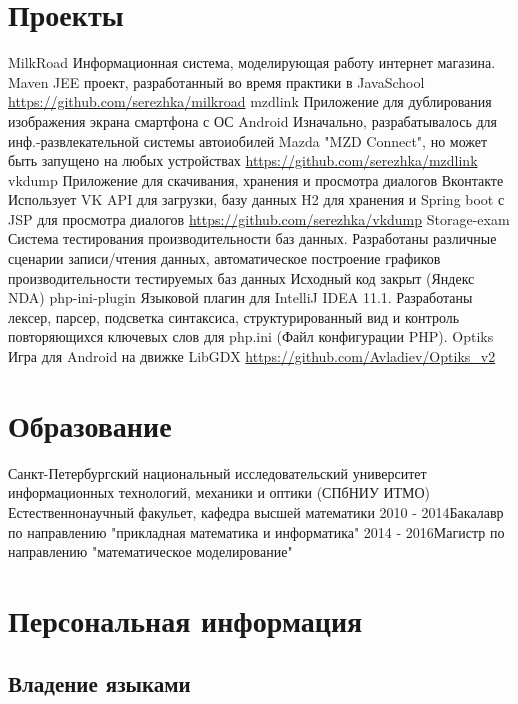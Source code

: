 \documentclass[11pt,a4paper,russian]{moderncv}
\begin{document}
\newpage  

\section{Проекты}
\cvline
    {MilkRoad}
    {Информационная система, моделирующая работу интернет магазина. Maven JEE проект, разработанный во время практики в JavaSchool \newline
    \url{https://github.com/serezhka/milkroad}}
\cvline
    {mzdlink}
    {Приложение для дублирования изображения экрана смартфона с ОС Android \newline
    Изначально, разрабатывалось для инф.-развлекательной системы автоиобилей Mazda "MZD Connect", но может быть запущено на любых устройствах \newline
    \url{https://github.com/serezhka/mzdlink}}
\cvline
    {vkdump}
    {Приложение для скачивания, хранения и просмотра диалогов Вконтакте \newline
    Использует VK API для загрузки, базу данных H2 для хранения и Spring boot с JSP для просмотра диалогов \newline
    \url{https://github.com/serezhka/vkdump}}
\cvline
    {Storage-exam}
    {Система тестирования производительности баз данных.\newline
    Разработаны различные сценарии записи/чтения данных, автоматическое построение графиков производительности тестируемых баз данных \newline Исходный код закрыт (Яндекс NDA)}
\cvline
    {php-ini-plugin}
    {Языковой плагин для IntelliJ IDEA 11.1. \newline
    Разработаны лексер, парсер, подсветка синтаксиса, структурированный вид и контроль повторяющихся ключевых слов для php.ini (Файл   конфигурации PHP).}  
\cvline
    {Optiks}
    {Игра для Android на движке LibGDX \newline
    \url{https://github.com/Avladiev/Optiks_v2}}
    
\section{Образование}
\cventry{}
    {\textnormal{Санкт-Петербургский национальный исследовательский университет информационных технологий, механики и оптики}{ (СПбНИУ ИТМО)}}
    {Естественнонаучный факульет, кафедра высшей математики}{}{}{}
\cventry
    {2010 - 2014}{Бакалавр по направлению "прикладная математика и информатика"}{}{}{}{}
\cventry
    {2014 - 2016}{Магистр по направлению "математическое моделирование"}{}{}{}{}

\section{Персональная информация}

\subsection{Владение языками}
\end{document}
